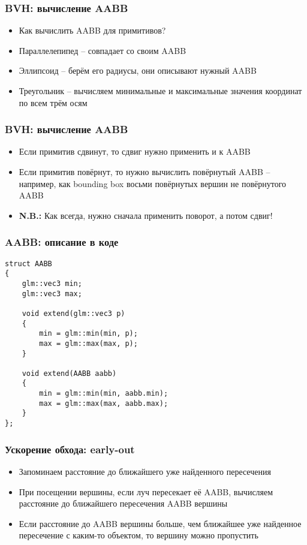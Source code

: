 \documentclass[handout,10pt]{beamer}
\begin{document}
\begin{frame}[fragile]
\frametitle{BVH: вычисление AABB}
\begin{itemize}
\item Как вычислить AABB для примитивов?
\pause
\item Параллелепипед -- совпадает со своим AABB
\pause
\item Эллипсоид -- берём его радиусы, они описывают нужный AABB
\pause
\item Треугольник -- вычисляем минимальные и максимальные значения координат по всем трём осям
\end{itemize}
\end{frame}

\begin{frame}[fragile]
\frametitle{BVH: вычисление AABB}
\begin{itemize}
\item Если примитив сдвинут, то сдвиг нужно применить и к AABB
\pause
\item Если примитив повёрнут, то нужно вычислить повёрнутый AABB -- например, как bounding box восьми повёрнутых вершин не повёрнутого AABB
\pause
\item \textbf{\alert{N.B.:}} Как всегда, нужно сначала применить поворот, а потом сдвиг!
\end{itemize}
\end{frame}

\begin{frame}[fragile]
\frametitle{AABB: описание в коде}
\begin{verbatim}
struct AABB
{
    glm::vec3 min;
    glm::vec3 max;

    void extend(glm::vec3 p)
    {
        min = glm::min(min, p);
        max = glm::max(max, p);
    }

    void extend(AABB aabb)
    {
        min = glm::min(min, aabb.min);
        max = glm::max(max, aabb.max);
    }
};
\end{verbatim}
\end{frame}

\begin{frame}[fragile]
\frametitle{Ускорение обхода: early-out}
\begin{itemize}
\item Запоминаем расстояние до ближайшего уже найденного пересечения
\pause
\item При посещении вершины, если луч пересекает её AABB, вычисляем расстояние до ближайшего пересечения AABB вершины
\pause
\item Если расстояние до AABB вершины больше, чем ближайшее уже найденное пересечение с каким-то объектом, то вершину можно пропустить
\end{itemize}
\end{frame}
\end{document}
